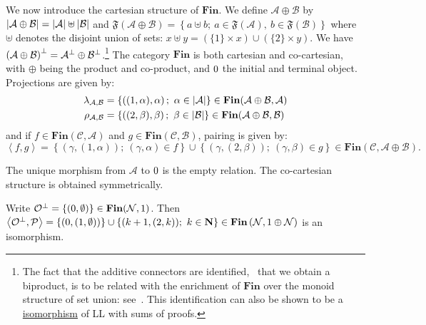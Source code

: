 We now introduce the cartesian structure of \(\mathbf{Fin}\). We define
\({\mathcal A} \oplus {\mathcal B}\) by
\(\left|{\mathcal A} \oplus {\mathcal B}\right| = \left|\mathcal A\right| \uplus \left|\mathcal B\right|\)
and
\(\mathfrak F\left({\mathcal A} \oplus {\mathcal B}\right) = \left\{ a\uplus b;\  a\in \mathfrak F\left(\mathcal A\right),\ b\in\mathfrak F\left(\mathcal B\right)\right\}\)
where \(\uplus\) denotes the disjoint union of sets:
\(x\uplus y=(\{1\}\times x)\cup(\{2\}\times y)\). We have
\(\left({\mathcal A}\oplus {\mathcal B}\right)^\bot = {\mathcal A}^\bot\oplus{\mathcal B}^\bot\).\footnote{The
  fact that the additive connectors are identified, \ie\ that we obtain
  a biproduct, is to be related with the enrichment of \(\mathbf{Fin}\)
  over the monoid structure of set union: see~\cite{differentialstructurebiadditive}. This identification can
  also be shown to be a \hyperref[isomorphism]{isomorphism} of LL with sums of proofs.}
The category \(\mathbf{Fin}\) is both cartesian and co-cartesian, with
\(\oplus\) being the product and co-product, and \(0\) the initial
and terminal object. Projections are given by:
\begin{align*}
\lambda_{{\mathcal A},{\mathcal B}}&=\left\{\left((1,\alpha),\alpha\right);\ \alpha\in\left|\mathcal A\right|\right\}
\in\mathbf{Fin}({\mathcal A}\oplus{\mathcal B},{\mathcal A}) \\
\rho_{{\mathcal A},{\mathcal B}}&=\left\{\left((2,\beta),\beta\right);\ \beta\in\left|\mathcal B\right|\right\}
\in\mathbf{Fin}({\mathcal A}\oplus{\mathcal B},{\mathcal B}) 
\end{align*}
and if \(f\in\mathbf{Fin}({\mathcal C},{\mathcal A})\) and
\(g\in\mathbf{Fin}({\mathcal C},{\mathcal B})\), pairing is given by:
\begin{equation*}
\left\langle f,g\right\rangle = \left\{\left(\gamma,(1,\alpha)\right);\ (\gamma,\alpha)\in f\right\} \cup \left\{\left(\gamma,(2,\beta)\right);\ (\gamma,\beta)\in g\right\} \in\mathbf{Fin}({\mathcal C},{\mathcal A}\oplus{\mathcal B}).
\end{equation*}

The unique morphism from \({\mathcal A}\) to \(0\) is the empty
relation. The co-cartesian structure is obtained symmetrically.

\begin{example}\label{example.-2}
Write \({\mathcal O}^\bot=\left\{(0,\emptyset)\right\}\in\mathbf{Fin}({\mathcal N},1)\). Then \(\left\langle{{\mathcal O}^\bot},{\mathcal{P}}\right\rangle =\{ (0,(1,\emptyset)) \}\cup \{ (k+1,(2,k)) ;\  k\in{\mathbf N} \} \in\mathbf{Fin}\left({\mathcal N},1\oplus{\mathcal N}\right)\) is an isomorphism.
\end{example}

